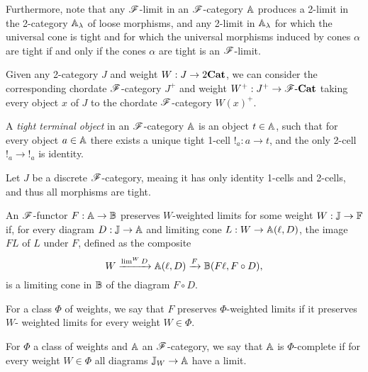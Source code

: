 \documentclass[../thesis.tex]{subfiles}
\begin{document}
  Furthermore, note that any ${\mathscr{F}}$-limit in an ${\mathscr{F}}$-category ${\mathbb{A}}$ produces a 2-limit in the 2-category ${\mathbb{A}}_
  \lambda$ of loose morphisms, and any 2-limit in ${\mathbb{A}}_\lambda$ for which the universal cone is tight and
  for which the universal morphisms induced by cones $\alpha$ are tight if and only if the cones $\alpha$ are
  tight is an ${\mathscr{F}}$-limit.

  \begin{example}
    Given any 2-category $J$ and weight $W : J \to 2{\mathbf{Cat}}$, we can consider the corresponding
    chordate ${\mathscr{F}}$-category $J^+$ and weight $W^+ : J^+ \to {\mathscr{F}}\text-{\mathbf{Cat}}$ taking every object
    $x$ of $J$ to the chordate ${\mathscr{F}}$-category $W(x)^+$. 
  \end{example}
  
  \begin{example}
    A \emph{tight terminal object} in an ${\mathscr{F}}$-category ${\mathbb{A}}$ is an object $t \in {\mathbb{A}}$, such that for
    every object $a \in {\mathbb{A}}$ there exists a unique tight 1-cell $!_a : a \to t$, and the only 2-cell
    $!_a \to\mathop{!}_a$ is identity. 
  \end{example}


  \begin{example}
    Let $J$ be a discrete ${\mathscr{F}}$-category, meaing it has only identity 1-cells and 2-cells, and thus all
    morphisms are tight.
  \end{example}

  \begin{definition}
    An ${\mathscr{F}}$-functor $F : {\mathbb{A}} \to {\mathbb{B}}$ preserves $W$-weighted limits for some weight $W : {\mathbb{J}} \to {\mathbb{F}}$ if,
    for every diagram $D : {\mathbb{J}} \to {\mathbb{A}}$ and limiting cone $L : W \to {\mathbb{A}}(\ell, D)$, the image $F L$ of $L$
    under $F$, defined as the composite
    \[W \xrightarrow{\lim^W D} {\mathbb{A}}(\ell, D) \xrightarrow{F} {\mathbb{B}}(F\ell, F \circ D),\]
    is a limiting cone in ${\mathbb{B}}$ of the diagram $F \circ D$.

    For a class $\Phi$ of weights, we say that $F$ preserves $\Phi$-weighted limits if it preserves $W$-%
    weighted limits for every weight $W \in \Phi$.
  \end{definition}

  \begin{definition}[Completeness]
    For $\Phi$ a class of weights and ${\mathbb{A}}$ an ${\mathscr{F}}$-category, we say that ${\mathbb{A}}$ is $\Phi$-complete if for
    every weight $W \in \Phi$ all diagrams ${\mathbb{J}}_W \to {\mathbb{A}}$ have a limit.
  \end{definition}
\end{document}
